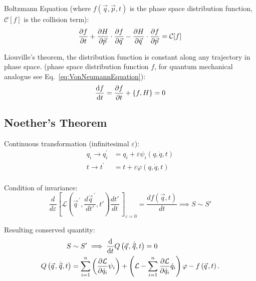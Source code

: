 		\noindent
		Boltzmann Equation (where $f(\vec{q},\vec{p},t)$ is the phase space distribution function, $\mathcal{C}[f]$ is the collision term):
		\begin{equation}
			\pdv{f}{t} + \pdv{H}{\vec{p}}\cdot\pdv{f}{\vec{q}} - \pdv{H}{\vec{q}}\cdot\pdv{f}{\vec{p}} = \mathcal{C}[f]
		\end{equation}

		\noindent
		Liouville's theorem, \ie the distribution function is constant along any trajectory in phase space. (phase space distribution function $f$, for quantum mechanical analogue see Eq.~\ref{eq:VonNeumannEquation}):
		\begin{equation}
			\label{eq:LiouvilleTheorem}
			\dv{f}{t} = \pdv{f}{t} + \qty{f, H} = 0
		\end{equation}

	\subsection{Noether's Theorem}
		\noindent
		Continuous transformation (infinitesimal $\varepsilon$):
		\begin{equation}
			\begin{aligned}
				q_i \to q_{i}^{\prime} &= q_i+\varepsilon\psi_i\left(q,\dot{q},t\right) \\
				t \to t^{\prime}\, &= t+\varepsilon\varphi\left(q,\dot{q},t\right) \\
			\end{aligned}
		\end{equation}

		\noindent
		Condition of invariance:
		\begin{equation}
			\frac{d}{d\varepsilon}\left[\mathcal{L}\left( {\vec{q}}^{\,\prime},\frac{d {\vec{q}}^{\,\prime}}{dt'},t'\right) \frac{dt'}{dt}\,\right]_{\varepsilon=0}=\frac{df(\vec{q}, t)}{dt} \implies S \sim S'
		\end{equation}

		\noindent
		Resulting conserved quantity:
		\begin{equation}
			\begin{aligned}
				S &\sim S' \implies
				\dv{t} Q\left(\vec{q},\dot{\vec{q}},t\right) = 0 \\
				Q\left(\vec{q},\dot{\vec{q}},t\right) &= \sum_{i=1}^{n}\left(\frac{\partial\mathcal{L}}{\partial{\dot{q}}_i}\psi_i\right)+\left(\mathcal{L}-\sum_{i=1}^{n}{\frac{\partial\mathcal{L}}{\partial{\dot{q}}_i}{\dot{q}}_i}\right)\varphi - f\left(\vec{q},t\right).
			\end{aligned}
		\end{equation}